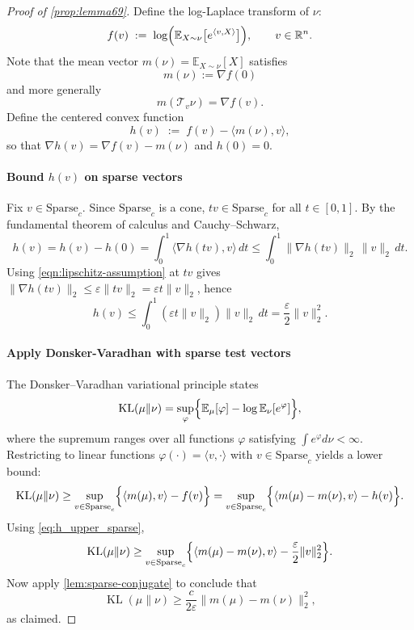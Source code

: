 \documentclass[11pt,reqno,letterpaper]{amsart}
\numberwithin{equation}{section}
\theoremstyle{definition}
\newcommand{\mb}{\mathbb}
\newcommand{\mc}{\mathcal}
\newcommand{\KL}{\operatorname{KL}}
\newcommand{\eps}{\varepsilon}
\let\originalleft\left
\let\originalright\right
\renewcommand{\left}{\mathopen{}\mathclose\bgroup\originalleft}
\renewcommand{\right}{\aftergroup\egroup\originalright}
\begin{document}
\begin{proof}
[Proof of \cref{prop:lemma69}]
Define the log-Laplace transform of $\nu$:
\[
f(v)\;:=\;\log\Bigl(\mathbb{E}_{X\sim \nu}\big[e^{\langle v,X\rangle}\big]\Bigr),
\qquad v\in\mathbb{R}^n.
\]
Note that the mean vector $m(\nu) = \mb{E}_{X \sim \nu}[X]$ satisfies
\[m(\nu):=\nabla f(0)\]
and more generally
\[m(\mc{T}_v \nu) = \nabla f(v).\]
Define the centered convex function
\[
h(v)\;:=\; f(v)-\langle m(\nu),v\rangle,
\]
so that $\nabla h(v)=\nabla f(v)-m(\nu)$ and $h(0)=0$.\\

\paragraph{\bf Bound $h(v)$ on sparse vectors}
Fix $v\in\mathrm{Sparse}_c$. Since $\mathrm{Sparse}_c$ is a cone, $tv\in\mathrm{Sparse}_c$ for all $t\in[0,1]$.
By the fundamental theorem of calculus and Cauchy--Schwarz,
\[
h(v)= h(v) - h(0) = \int_0^1 \langle \nabla h(tv),v\rangle\,dt
\le \int_0^1 \|\nabla h(tv)\|_2\,\|v\|_2\,dt.
\]
Using \cref{eqn:lipschitz-assumption} at $tv$ gives $\|\nabla h(tv)\|_2\le \eps \|tv\|_2=\eps t\|v\|_2$, hence
\begin{equation}
h(v)\le \int_0^1 (\eps t\|v\|_2)\|v\|_2\,dt = \frac{\eps}{2}\|v\|_2^2.
\label{eq:h_upper_sparse}
\end{equation}

\paragraph{\bf Apply Donsker-Varadhan with sparse test vectors}
The Donsker--Varadhan variational principle states
\[
\KL(\mu\|\nu)=\sup_{\varphi}\Bigl\{\mathbb{E}_\mu[\varphi]-\log\mathbb{E}_\nu[e^{\varphi}]\Bigr\},
\]
where the supremum ranges over all functions $\varphi$ satisfying $\int e^{\varphi} d\nu < \infty$. Restricting to linear functions $\varphi(\cdot)=\langle v,\cdot\rangle$ with $v\in\mathrm{Sparse}_c$ yields a lower bound:
\[
\KL(\mu\|\nu)
\ge \sup_{v\in\mathrm{Sparse}_c}\Bigl\{\langle m(\mu),v\rangle - f(v)\Bigr\}
= \sup_{v\in\mathrm{Sparse}_c}\Bigl\{\langle m(\mu) - m(\nu),v\rangle - h(v)\Bigr\}.
\]
Using \eqref{eq:h_upper_sparse},
\[
\KL(\mu\|\nu)
\ge \sup_{v\in\mathrm{Sparse}_c}\left\{\langle m(\mu) - m(\nu),v\rangle - \frac{\eps}{2}\|v\|_2^2\right\}.
\]
Now apply \cref{lem:sparse-conjugate} to conclude that
\[
\KL(\mu\|\nu)\ge \frac{c}{2\eps}\|m(\mu) - m(\nu)\|_{2}^2,
\]
as claimed.
\end{proof}
\end{document}
